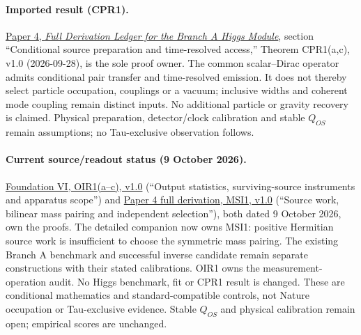 \documentclass[11pt]{article}
\begin{document}
\paragraph{Imported result (CPR1).}
\href{https://github.com/tau-core-research/tau-core-higgs-module-paper4/blob/main/paper4_full_derivation/full_derivation.pdf#nameddest=cpr1}{Paper 4, \emph{Full Derivation Ledger for the Branch A Higgs Module}}, section ``Conditional source preparation and time-resolved access,'' Theorem CPR1(a,c), v1.0 (2026-09-28), is the sole proof owner.
The common scalar--Dirac operator admits conditional pair transfer and time-resolved emission. It does not thereby select particle occupation, couplings or a vacuum; inclusive widths and coherent mode coupling remain distinct inputs. No additional particle or gravity recovery is claimed.
Physical preparation, detector/clock calibration and stable $Q_{OS}$ remain assumptions; no Tau-exclusive observation follows.

\paragraph{Current source/readout status (9 October 2026).}
\href{https://github.com/tau-core-research/tau-core-quantum-readout-foundation-paper-vi/blob/main/paperVI_submission_source/main.pdf#nameddest=oir1}{Foundation VI, OIR1(a--c), v1.0} (``Output statistics, surviving-source instruments and apparatus scope'') and \href{https://github.com/tau-core-research/tau-core-higgs-module-paper4/blob/main/paper4_full_derivation/full_derivation.pdf#nameddest=msi1}{Paper 4 full derivation, MSI1, v1.0} (``Source work, bilinear mass pairing and independent selection''), both dated 9 October 2026, own the proofs.
The detailed companion now owns MSI1: positive Hermitian source work is insufficient to choose the symmetric mass pairing. The existing Branch A benchmark and successful inverse candidate remain separate constructions with their stated calibrations. OIR1 owns the measurement-operation audit. No Higgs benchmark, fit or CPR1 result is changed.
These are conditional mathematics and standard-compatible controls, not Nature occupation or Tau-exclusive evidence. Stable $Q_{OS}$ and physical calibration remain open; empirical scores are unchanged.
\end{document}
